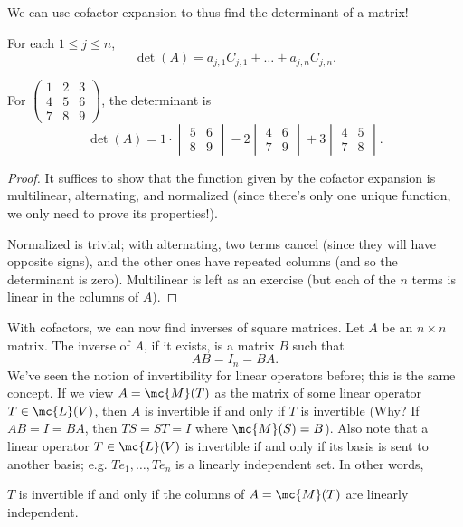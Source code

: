\documentclass[math0540-lecture-notes.tex]{subfiles}
\begin{document}
We can use cofactor expansion to thus find the determinant of a matrix!
\begin{theorem}{}
  For each $1\le j\le n$, \[
    \det{(A)}=a_{j,1}C_{j,1}+\ldots+a_{j,n}C_{j,n}
  .\] 
\end{theorem}
\begin{example}
  For $\begin{pmatrix} 1&2&3\\4&5&6\\7&8&9 \end{pmatrix} $, the determinant is \[
  \det{(A)}=1\cdot \begin{vmatrix} 5&6\\8&9 \end{vmatrix} -2\begin{vmatrix} 4&6\\7&9 \end{vmatrix}
  +3\begin{vmatrix} 4&5\\7&8 \end{vmatrix} 
  .\] 
\end{example}

\begin{proof}[Proof]
  It suffices to show that the function given by the cofactor expansion is multilinear, alternating,
  and normalized (since there's only one unique function, we only need to prove its properties!).

  Normalized is trivial; with alternating, two terms cancel (since they will have opposite signs),
  and the other ones have repeated columns (and so the determinant is zero). Multilinear is left as
  an exercise (but each of the $n$ terms is linear in the columns of $A$).
\end{proof}

With cofactors, we can now find inverses of square matrices. Let $A$ be an $n\times n$ matrix. The
inverse of $A$, if it exists, is a matrix $B$ such that \[
  AB=I_n=BA
.\] We've seen the notion of invertibility for linear operators before; this is the same concept. If
we view $A=\mc{M}(T)$ as the matrix of some linear operator $T\in \mc{L}(V)$, then $A$ is invertible
if and only if $T$ is invertible (Why? If $AB=I=BA$, then $TS=ST=I$ where $\mc{M}(S)=B$). Also
note that a linear operator $T\in \mc{L}(V)$ is invertible if and only if its basis is sent to
another basis; e.g. $Te_1,\ldots,Te_n$ is a linearly independent set. In other words, \begin{center}
    $T$ is invertible if and only if the columns of $A=\mc{M}(T)$ are linearly independent.
\end{center}
\end{document}
